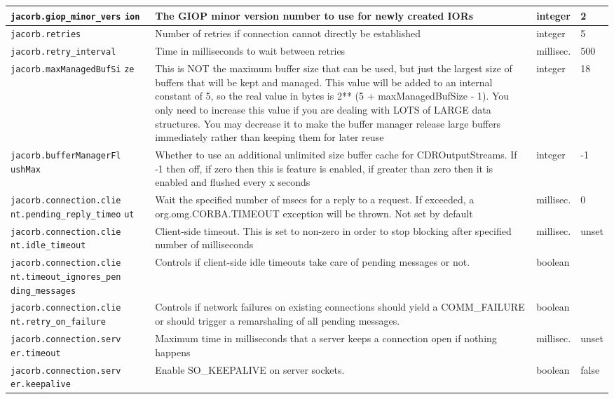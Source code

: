 {{\begin{small}
\begin{longtable}{|p{5cm}|p{7.5cm}|p{1.5cm}|p{1.5cm}|}
\verb"jacorb.giop_minor_vers"
\verb"ion" & The GIOP minor version number to use for newly created
IORs & integer & 2 \\
\hline
\verb"jacorb.retries" & Number of retries if connection cannot
directly be established & integer & 5 \\
\hline
\verb"jacorb.retry_interval" & Time in milliseconds to wait between
retries & millisec. & 500 \\
\hline
\verb"jacorb.maxManagedBufSi"
\verb"ze" & This is NOT the maximum buffer size that can be used, but
just the largest size of buffers that will be kept and managed. This
value will be added to an internal constant of 5, so the real value in
bytes is 2** (5 + maxManagedBufSize - 1). You only need to increase
this value if you are dealing with LOTS of LARGE data structures. You
may decrease it to make the buffer manager release large buffers
immediately rather than keeping them for later reuse & integer & 18 \\
\hline
\verb"jacorb.bufferManagerFl"
\verb"ushMax" & Whether to use an additional unlimited size buffer
cache for CDROutputStreams. If -1 then off, if zero then this is
feature is enabled, if greater than zero then it is enabled and
flushed every x seconds & integer & -1 \\
\hline
\hline
\verb"jacorb.connection.clie"
\verb"nt.pending_reply_timeo"
\verb"ut" &  Wait the specified number of msecs for a reply to a
request. If exceeded, a org.omg.CORBA.TIMEOUT exception will be
thrown. Not set by default & millisec. & 0  \\
\hline
\verb"jacorb.connection.clie"
\verb"nt.idle_timeout" & Client-side timeout. This is set to non-zero in order
to stop blocking after specified number of milliseconds & millisec. &
unset \\
\hline
\verb"jacorb.connection.clie"
\verb"nt.timeout_ignores_pen"
\verb"ding_messages" & Controls if client-side idle timeouts take care of
pending messages or not. & boolean & \\
\hline
\verb"jacorb.connection.clie"
\verb"nt.retry_on_failure" & Controls if network failures on existing connections
should yield a COMM\_FAILURE or should trigger a remarshaling
of all pending messages. & boolean & \\
\hline
\verb"jacorb.connection.serv"
\verb"er.timeout" & Maximum time in milliseconds that a server keeps a
connection open if nothing happens & millisec. & unset \\
\hline
\verb"jacorb.connection.serv"
\verb"er.keepalive" & Enable SO\_KEEPALIVE on server sockets. & boolean & false \\

\end{longtable}
\end{small}}}
